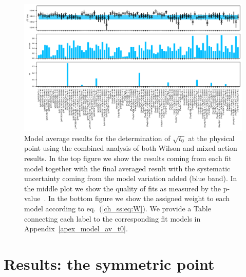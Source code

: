 \begin{figure}
    \centering
    \includegraphics[width=1.\textwidth]{./cap5/figs/BMA_comb.pdf}
    \caption{Model average results for the determination of $\sqrt{t_0}$ at the physical point using the combined analysis of both Wilson and mixed action results. In the top figure we show the results coming from each fit model together with the final averaged result with the systematic uncertainty coming from the model variation added (blue band). In the middle plot we show the quality of fits as measured by the p-value~\cite{chi_exp}. In the bottom figure we show the assigned weight to each model according to eq.~(\ref{ch_ss:eq:W}). We provide a Table connecting each label to the corresponding fit models in Appendix~\ref{apex_model_av_t0}.}
    \label{ch_ss:fig:BMA_comb}
\end{figure}

\section{Results: the symmetric point}

